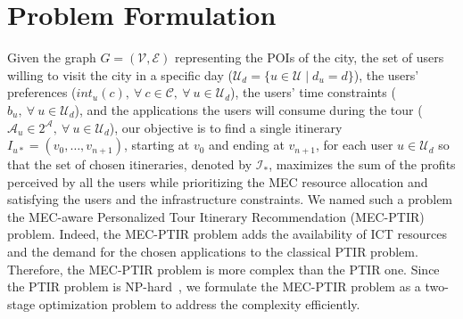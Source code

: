\section{Problem Formulation}\label{sec:problem-formulation}

Given the graph $G=(\mathcal{V},\mathcal{E})$ representing the POIs of the city, the set of users willing to visit the city in a specific day ($\mathcal{U}_d=\{u \in \mathcal{U} \mid d_u=d\}$), the users' preferences ($int_{u}(c), \ \forall \ c \in \mathcal{C}, \ \forall \ u \in \mathcal{U}_d$), the users' time constraints ($b_u, \ \forall \ u \in \mathcal{U}_d$), and the applications the users will consume during the tour ($\mathcal{A}_{u} \in 2^{\mathcal{A}}, \ \forall \ u \in \mathcal{U}_d$), our objective is to find a single itinerary $I_{u*}=(v_0,\dots,v_{n+1})$, starting at $v_0$ and ending at $v_{n+1}$, for each user $u \in \mathcal{U}_d$ so that the set of chosen itineraries, denoted by $\mathcal{I_{*}}$, maximizes the sum of the profits perceived by all the users while prioritizing the MEC resource allocation and satisfying the users and the infrastructure constraints. We named such a problem the MEC-aware Personalized Tour Itinerary Recommendation (MEC-PTIR) problem. Indeed, the MEC-PTIR problem adds the availability of ICT resources and the demand for the chosen applications to the classical PTIR problem. Therefore, the MEC-PTIR problem is more complex than the PTIR one. Since the PTIR problem is NP-hard~\cite{gavalas-survey:14}, we formulate the MEC-PTIR problem as a two-stage optimization problem to address the complexity efficiently.

